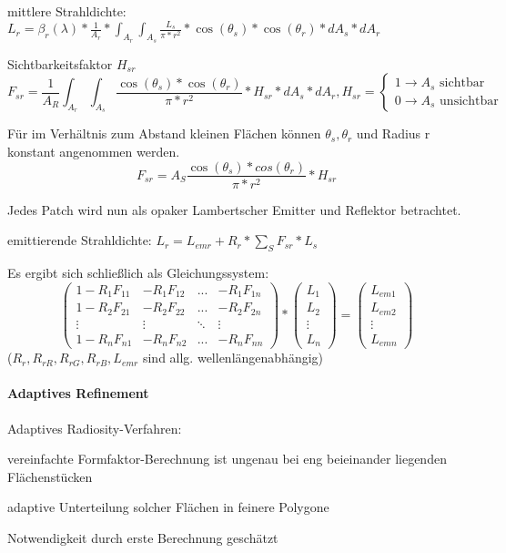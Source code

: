 \documentclass[landscape]{article}
\begin{document}
\begin{multicols}{3}
  mittlere Strahldichte: $L_r=\beta_r(\lambda)*\frac{1}{A_r}*\int_{A_r}\int_{A_s}\frac{L_s}{\pi*r^2}*\cos(\theta_s)*\cos(\theta_r)*dA_s*dA_r$
  
  Sichtbarkeitsfaktor $H_{sr}$
  $$F_{sr}=\frac{1}{A_R}\int_{A_r}\int_{A_s}\frac{\cos(\theta_s)*\cos(\theta_r)}{\pi*r^2}*H_{sr}*dA_s*dA_r, H_{sr}=\begin{cases}1\rightarrow A_s \text{ sichtbar}\\ 0\rightarrow A_s \text{ unsichtbar}\end{cases}$$
  
  Für im Verhältnis zum Abstand kleinen Flächen können $\theta_s,\theta_r$ und Radius r konstant angenommen werden.
  $$F_{sr}=A_S \frac{\cos(\theta_s)*cos(\theta_r)}{\pi*r^2}*H_{sr}$$
  
  Jedes Patch wird nun als opaker Lambertscher Emitter und Reflektor betrachtet.
  
  emittierende Strahldichte: $L_r=L_{emr}+R_r*\sum_S F_{sr}*L_s$
  
  Es ergibt sich schließlich als Gleichungssystem:
  $$ \begin{pmatrix} 1-R_1F_{11} & -R_1F_{12} &...& -R_1F_{1n}\\ 1-R_2F_{21} & -R_2F_{22} &...& -R_2F_{2n}\\ \vdots & \vdots & \ddots & \vdots \\ 1-R_nF_{n1} & -R_nF_{n2} &...& -R_nF_{nn} \end{pmatrix} * \begin{pmatrix} L_1\\L_2\\\vdots\\L_n \end{pmatrix} = \begin{pmatrix} L_{em1}\\L_{em2}\\\vdots\\L_{emn} \end{pmatrix}$$
  ($R_r, R_{rR}, R_{rG}, R_{rB}, L_{emr}$ sind allg. wellenlängenabhängig)
  
  \paragraph{Adaptives Refinement}
  Adaptives Radiosity-Verfahren:
  \begin{itemize*}
    \item vereinfachte Formfaktor-Berechnung ist ungenau bei eng beieinander liegenden Flächenstücken
    \item adaptive Unterteilung solcher Flächen in feinere Polygone
    \item Notwendigkeit durch erste Berechnung geschätzt
  \end{itemize*}
  

\end{multicols}
\end{document}
